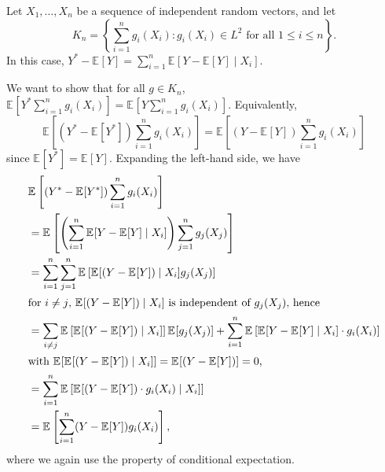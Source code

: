 \begin{eg}\label{eg:projection}
	Let \(X_1, \dots , X_n\) be a sequence of independent random vectors, and let
	\[
		K_n = \left\{ \sum_{i=1}^{n} g_i(X_i) \colon g_i(X_i) \in L^2 \text{ for all } 1 \leq i \leq n \right\}.
	\]
	In this case, \(Y^{\ast} - \mathbb{E}_{}[Y] = \sum_{i=1}^{n} \mathbb{E}_{}[Y - \mathbb{E}_{}[Y] \mid X_i] \).
\end{eg}
\begin{explanation}
	We want to show that for all \(g \in K_n\), \(\mathbb{E}_{}[Y^{\ast} \sum_{i=1}^{n} g_i(X_i)] = \mathbb{E}_{}[Y \sum_{i=1}^{n} g_i(X_i)] \). Equivalently,
	\[
		\mathbb{E}_{}\left[(Y^{\ast} - \mathbb{E}_{}[Y^{\ast} ] ) \sum_{i=1}^{n} g_i(X_i)\right]
		= \mathbb{E}_{}\left[(Y - \mathbb{E}_{}[Y] ) \sum_{i=1}^{n} g_i(X_i)\right]
	\]
	since \(\mathbb{E}_{}[Y^{\ast} ] = \mathbb{E}_{}[Y] \). Expanding the left-hand side, we have
	\begin{align*}
		 & \mathbb{E}_{}\left[(Y^{\ast} - \mathbb{E}_{}[Y^{\ast} ] ) \sum_{i=1}^{n} g_i(X_i)\right]                                                                                                                                     \\
		 & = \mathbb{E}_{}\left[\left( \sum_{i=1}^{n} \mathbb{E}_{}[Y - \mathbb{E}_{}[Y] \mid X_i] \right) \sum_{j=1}^{n} g_j(X_j)\right]                                                                                               \\
		 & = \sum_{i=1}^{n} \sum_{j=1}^{n} \mathbb{E}_{}\left[\mathbb{E}_{}[(Y - \mathbb{E}_{}[Y] ) \mid X_i] g_j(X_j) \right]                                                                                                          \\
		\shortintertext{for \(i\neq j\), \(\mathbb{E}_{}[(Y - \mathbb{E}_{}[Y] ) \mid X_i ] \) is independent of \(g_j(X_j)\), hence}
		 & = \sum_{i \neq j} \mathbb{E}_{}\left[\mathbb{E}_{}[(Y - \mathbb{E}_{}[Y] ) \mid X_i] \right] \mathbb{E}_{}[g_j(X_j) ] + \sum_{i=1}^{n} \mathbb{E}_{}\left[\mathbb{E}_{}[Y - \mathbb{E}_{}[Y] \mid X_i] \cdot g_i(X_i)\right] \\
		\shortintertext{with \(\mathbb{E}_{}[\mathbb{E}_{}[(Y - \mathbb{E}_{}[Y] ) \mid X_i ] ]= \mathbb{E}_{}[(Y - \mathbb{E}_{}[Y] ) ] = 0\),}
		 & =  \sum_{i=1}^{n} \mathbb{E}_{}\left[\mathbb{E}_{}[(Y - \mathbb{E}_{}[Y]) \cdot g_i(X_i) \mid X_i]\right]                                                                                                                    \\
		 & = \mathbb{E}_{}\left[\sum_{i=1}^{n} (Y - \mathbb{E}_{}[Y] ) g_i(X_i) \right],
	\end{align*}
	where we again use the property of conditional expectation.
\end{explanation}

